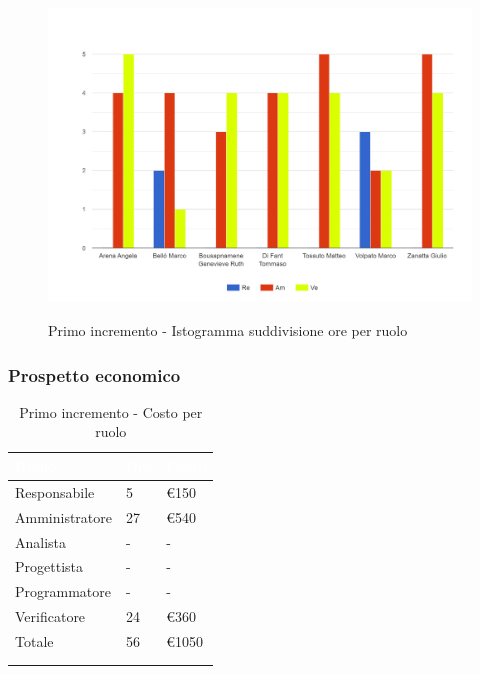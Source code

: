 {{      \begin{figure}[H]
        \includegraphics[width=15cm]{sezioni/images/primo.png}
        \centering
        \\
        \caption{Primo incremento - Istogramma suddivisione ore per ruolo}
     \end{figure}
    }

    \subsubsection{Prospetto economico}
    {
        \setlength{\freewidth}{\dimexpr\textwidth-30\tabcolsep}
        \renewcommand{\arraystretch}{1.0}
        \setlength{\aboverulesep}{0pt}
        \setlength{\belowrulesep}{0pt}
        \begin{longtable}{C{.3\freewidth} C{.2\freewidth} C{.2\freewidth}}
          \toprule
        \textcolor{white}{\textbf{Ruolo}}&
        \textcolor{white}{\textbf{Ore}}&
        \textcolor{white}{\textbf{Costo}}\\
        \toprule
        \endhead
            
        Responsabile & 5 & \euro150\\        
        Amministratore & 27 & \euro540\\        
        Analista & - &-\\        
        Progettista&-&-\\        
        Programmatore&-&-\\
        Verificatore&24 & \euro360\\
        Totale&56&\euro1050\\
        \bottomrule
        \\
        \caption{Primo incremento - Costo per ruolo}


\end{longtable}}}

